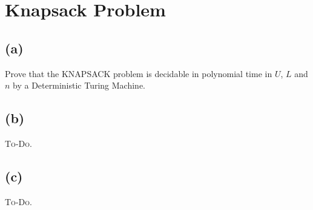 

\setcounter{section}{1}


\section{Knapsack Problem}

\subsection{(a)}

Prove that the \textsc{KNAPSACK} problem is decidable in polynomial time in $U$, $L$ and $n$ by a Deterministic Turing Machine.



\subsection{(b)}

\textsc{To-Do.}

\subsection{(c)}

\textsc{To-Do.}



